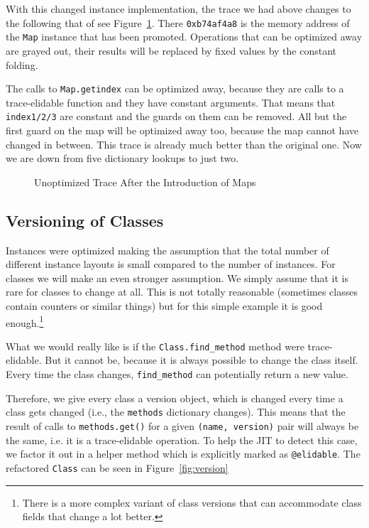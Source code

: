 \documentclass{sigplanconf}
\begin{document}
With this changed instance implementation, the trace we had above changes to the
following that of see Figure~\ref{fig:trace2}. There \texttt{0xb74af4a8} is the
memory address of the \texttt{Map} instance that has been promoted. Operations
that can be optimized away are grayed out, their results will be replaced by
fixed values by the constant folding.

The calls to \texttt{Map.getindex} can be optimized away, because they are calls to
a trace-elidable function and they have constant arguments. That means that \texttt{index1/2/3}
are constant and the guards on them can be removed. All but the first guard on
the map will be optimized away too, because the map cannot have changed in
between. This trace is already much better than
the original one. Now we are down from five dictionary lookups to just two.

\begin{figure}

\caption{Unoptimized Trace After the Introduction of Maps}
\label{fig:trace2}
\end{figure}





\subsection{Versioning of Classes}

Instances were optimized making the assumption that the total number of
different instance layouts is small compared to the number of instances. For classes we
will make an even stronger assumption. We simply assume that it is rare for
classes to change at all. This is not totally reasonable (sometimes classes contain
counters or similar things) but for this simple example it is good
enough.\footnote{There is a more complex variant of class versions that can
accommodate class fields that change a lot better.}

What we would really like is if the \texttt{Class.find\_method} method were trace-elidable.
But it cannot be, because it is always possible to change the class itself.
Every time the class changes, \texttt{find\_method} can potentially return a
new value.

Therefore, we give every class a version object, which is changed every time a
class gets changed (i.e., the \texttt{methods} dictionary changes).
This means that the result of calls to \texttt{methods.get()} for a given \texttt{(name,
version)} pair will always be the same, i.e. it is a trace-elidable operation.  To help
the JIT to detect this case, we factor it out in a helper method which is
explicitly marked as \texttt{@elidable}. The refactored \texttt{Class} can
be seen in Figure~\ref{fig:version}
\end{document}
